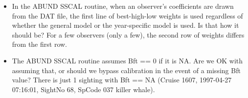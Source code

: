 \documentclass[
]{book}
\begin{document}
\begin{itemize}
\item
  In the ABUND SSCAL routine, when an observer's coefficients are drawn from the DAT file, the first line of best-high-low weights is used regardless of whether the general model or the year-specific model is used. Is that how it should be? For a few observers (only a few), the second row of weights differs from the first row.
\item
  The ABUND SSCAL routine assumes Bft == 0 if it is NA. Are we OK with assuming that, or should we bypass calibration in the event of a missing Bft value? There is just 1 sighting with Bft == NA (Cruise 1607, 1997-04-27 07:16:01, SightNo 68, SpCode 037 killer whale).
\end{itemize}

  
\end{document}

